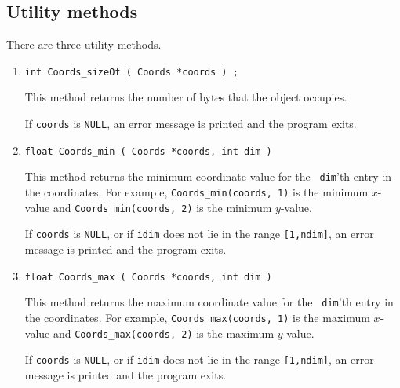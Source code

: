 \subsection{Utility methods}
\label{subsection:Coords:proto:utilities}
\par
There are three utility methods.
\par
\begin{enumerate}
\item
\begin{verbatim}
int Coords_sizeOf ( Coords *coords ) ;
\end{verbatim}
This method returns the number of bytes that the object occupies.
\par {}
If {\tt coords} is {\tt NULL},
an error message is printed and the program exits.
\item
\begin{verbatim}
float Coords_min ( Coords *coords, int dim )
\end{verbatim}
This method returns the minimum coordinate value for the {\tt
dim}'th entry in the coordinates.
For example, {\tt Coords\_min(coords, 1)} is the minimum $x$-value
and {\tt Coords\_min(coords, 2)} is the minimum $y$-value.
\par {}
If {\tt coords} is {\tt NULL},
or if {\tt idim} does not lie in the range {\tt [1,ndim]},
an error message is printed and the program exits.
\item
\begin{verbatim}
float Coords_max ( Coords *coords, int dim )
\end{verbatim}
This method returns the maximum coordinate value for the {\tt
dim}'th entry in the coordinates.
For example, {\tt Coords\_max(coords, 1)} is the maximum $x$-value
and {\tt Coords\_max(coords, 2)} is the maximum $y$-value.
\par {}
If {\tt coords} is {\tt NULL},
or if {\tt idim} does not lie in the range {\tt [1,ndim]},
an error message is printed and the program exits.

\end{enumerate}
